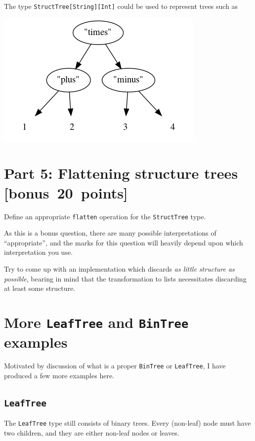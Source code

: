 \documentclass[11pt]{article}
\begin{document}
The type \texttt{StructTree[String][Int]} could be used
to represent trees such as
\begin{center}
\includegraphics[width=\textwidth]{media/StructTree.png}
\end{center}

\section*{Part 5: Flattening structure trees   [bonus 20 points]}
\label{sec:org0cdeb63}
Define an appropriate \texttt{flatten} operation for the \texttt{StructTree} type.

As this is a bonus question, there are many possible
interpretations of “appropriate”, and the marks for this question
will heavily depend upon which interpretation you use.

Try to come up with an implementation
which discards \emph{as little structure as possible},
bearing in mind that the transformation to lists
necessitates discarding at least some structure.
\section*{More \texttt{LeafTree} and \texttt{BinTree} examples}
\label{sec:orgeb2101b}
Motivated by discussion of what is a proper \texttt{BinTree} or \texttt{LeafTree},
I have produced a few more examples here.

\subsection*{\texttt{LeafTree}}
\label{sec:orgb8ff452}
The \texttt{LeafTree} type still consists of binary trees.
Every (non-leaf) node must have two children,
and they are either non-leaf nodes or leaves.
\end{document}
